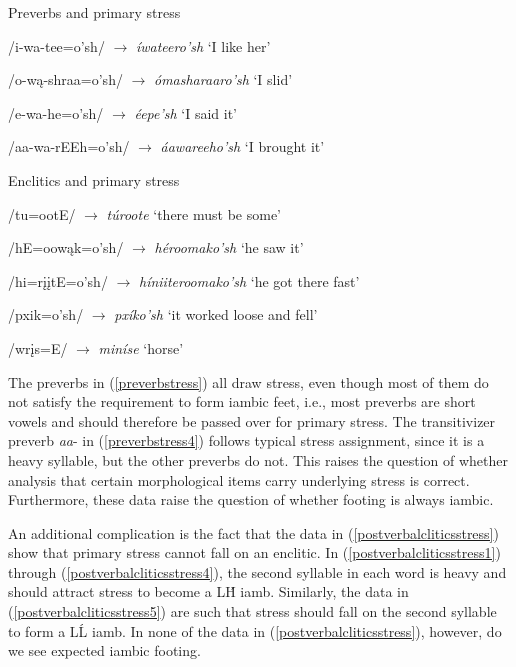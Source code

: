\begin{exe}
\item\label{preverbstress} Preverbs and primary stress

	\begin{xlist}
	\item\label{preverbstress1} /i-wa-tee=o'sh/ $\to$ \textit{íwateero'sh} `I like her'
	\item\label{preverbstress2} /o-wą-shraa=o'sh/ $\to$ \textit{ómasharaaro'sh} `I slid'
	\item\label{preverbstress3} /e-wa-he=o'sh/ $\to$ \textit{éepe'sh} `I said it'
	\item\label{preverbstress4} /aa-wa-rEEh=o'sh/ $\to$ \textit{áawareeho'sh} `I brought it'
	\end{xlist}

\item\label{postverbalcliticsstress} Enclitics and primary stress

	\begin{xlist}
	\item\label{postverbalcliticsstress1} /tu=ootE/ $\to$ \textit{túroote} `there must be some'
	\item\label{postverbalcliticsstress2} /hE=oowąk=o'sh/ $\to$ \textit{héroomako'sh} `he saw it'
	\item\label{postverbalcliticsstress3} /hi=rįįtE=o'sh/ $\to$ \textit{híniiteroomako'sh} `he got there fast'
	\item\label{postverbalcliticsstress4} /pxik=o'sh/ $\to$ \textit{pxíko'sh} `it worked loose and fell'
	\item\label{postverbalcliticsstress5} /wrįs=E/ $\to$ \textit{miníse} `horse'
	\end{xlist}

\end{exe}

The preverbs in (\ref{preverbstress}) all draw stress, even though most of them do not satisfy the requirement to form iambic feet, i.e., most preverbs are short vowels and should therefore be passed over for primary stress. The transitivizer preverb \textit{aa}- in (\ref{preverbstress4}) follows typical stress assignment, since it is a heavy syllable, but the other preverbs do not. This raises the question of whether  analysis that certain morphological items carry underlying stress is correct. Furthermore, these data raise the question of whether footing is always iambic.

An additional complication is the fact that the data in (\ref{postverbalcliticsstress}) show that primary stress cannot fall on an enclitic. In (\ref{postverbalcliticsstress1}) through (\ref{postverbalcliticsstress4}), the second syllable in each word is heavy and should attract stress to become a LH́ iamb. Similarly, the data in (\ref{postverbalcliticsstress5}) are such that stress should fall on the second syllable to form a LĹ iamb. In none of the data in (\ref{postverbalcliticsstress}), however, do we see expected iambic footing.

